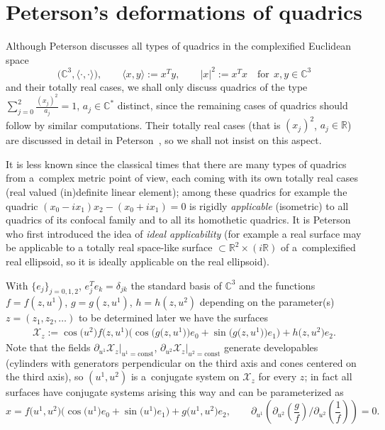 \documentclass[11pt]{article}
\begin{document}
\section{Peterson's deformations of quadrics}\label{sec:pet}

Although Peterson \cite{P} discusses all types of quadrics in the
complexif\/ied Euclidean space
\[
\big(\mathbb{C}^3,\langle \cdot,\cdot\rangle\big),\qquad \langle x,y\rangle:=x^Ty,\qquad |x|^2:=x^Tx\quad \mathrm{for}\ \
x,y\in\mathbb{C}^3
\]
and their totally real cases, we shall only discuss quadrics of
the type $\sum\limits_{j=0}^2\frac{(x_j)^2}{a_j}=1$, $a_j\in\mathbb{C}^*$
distinct, since the remaining cases of quadrics should follow by
similar computations. Their totally real cases (that is
$(x_j)^2$, $a_j\in\mathbb{R}$) are discussed in detail in Peterson~\cite{P}, so we shall not insist on this aspect.

\begin{remark}
It is less known since the classical times that there are many
types of quadrics from a~complex metric point of view, each coming
with its own totally real cases (real valued (in)def\/inite linear
element); among these quadrics for example the quadric
$(x_0-ix_1)x_2-(x_0+ix_1)=0$ is rigidly {\it applicable}
(isometric) to all quadrics of its confocal family and to all its
homothetic quadrics. It is Peterson who f\/irst introduced the idea
of {\it ideal applicability} (for example a real surface may be
applicable to a totally real space-like surface
$\subset\mathbb{R}^2\times(i\mathbb{R})$ of a~complexif\/ied real
ellipsoid, so it is ideally applicable on the real ellipsoid).
\end{remark}

With $\{e_j\}_{j=0,1,2}$, $e_j^Te_k=\delta_{jk}$ the standard basis
of $\mathbb{C}^3$  and the functions $f=f(z,u^1)$, $g=g(z,u^1)$,
$h=h(z,u^2)$ depending on the parameter(s) $z=(z_1,z_2,\dots )$ to be
determined later we have the surfaces
\begin{gather}
\mathcal{X}_z:=\cos\big(u^2\big)f\big(z,u^1\big)\big(\cos\big(g\big(z,u^1\big)\big)e_0+\sin
\big(g\big(z,u^1\big)\big)e_1\big)+h\big(z,u^2\big)e_2.
\label{eq:surf}
\end{gather}
Note that the f\/ields
$\partial_{u^1}\mathcal{X}_z|_{u^1=\mathrm{const}}$,
$\partial_{u^2}\mathcal{X}_z|_{u^2=\mathrm{const}}$ generate developables
(cylinders with gene\-ra\-tors perpendicular on the third axis and
cones centered on the third axis), so $(u^1,u^2)$ is a~conjugate
system on $\mathcal{X}_z$ for every $z$; in fact all surfaces have
conjugate systems arising this way and can be parameterized as
\[
x=f\big(u^1,u^2\big)\big(\cos\big(u^1\big)e_0+\sin\big(u^1\big)e_1\big)+g\big(u^1,u^2\big)e_2, \qquad
\partial_{u^1}\left(\partial_{u^2}\left(\frac{g}{f}\right){\Big/}\partial_{u^2}\left(\frac{1}{f}\right)\right)=0.
\]
\end{document}
